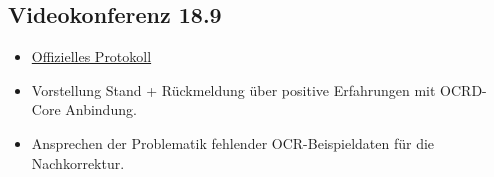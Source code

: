 \subsection {Videokonferenz  18.9}
\begin{itemize}
  \item \href{https://wiki.de.dariah.eu/display/OCR/2018-09-18+Besprechungsnotizen}{Offizielles Protokoll}
  \item Vorstellung Stand + Rückmeldung über positive Erfahrungen mit OCRD-Core Anbindung.
  \item Ansprechen der Problematik fehlender OCR-Beispieldaten für die Nachkorrektur.
  
\end{itemize}


